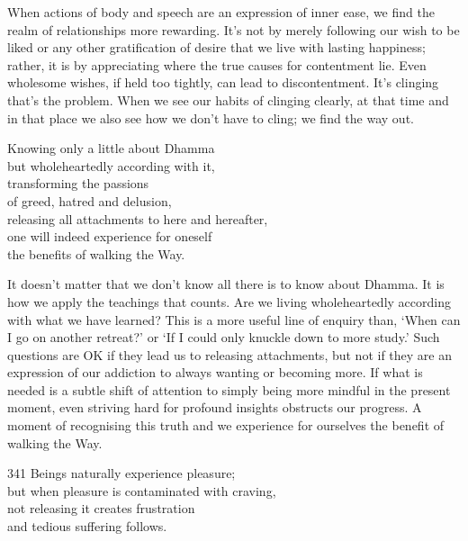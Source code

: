 \begin{dhpRefl}

When actions of body and speech are an expression of inner ease, we
find the realm of relationships more rewarding. It's not by merely
following our wish to be liked or any other gratification of desire
that we live with lasting happiness; rather, it is by appreciating
where the true causes for contentment lie. Even wholesome wishes, if
held too tightly, can lead to discontentment. It's clinging that's the
problem. When we see our habits of clinging clearly, at that time and
in that place we also see how we don't have to cling; we find the way
out.

\end{dhpRefl}


\begin{dhpVerse}{20}
\label{dhp-20}
Knowing only a little about Dhamma\\
but wholeheartedly according with it,\\
transforming the passions\\
of greed, hatred and delusion,\\
releasing all attachments to here and hereafter,\\
one will indeed experience for oneself\\
the benefits of walking the Way.
\end{dhpVerse}

\begin{dhpRefl}

It doesn't matter that we don't know all there is to know about
Dhamma. It is how we apply the teachings that counts. Are we living
wholeheartedly according with what we have learned? This is a more
useful line of enquiry than, `When can I go on another retreat?' or
`If I could only knuckle down to more study.' Such questions are OK
if they lead us to releasing attachments, but not if they are an
expression of our addiction to always wanting or becoming more. If
what is needed is a subtle shift of attention to simply being more
mindful in the present moment, even striving hard for profound
insights obstructs our progress. A moment of recognising this truth
and we experience for ourselves the benefit of walking the Way.

\end{dhpRefl}


\begin{dhpVerse}{341}
\label{dhp-341}
Beings naturally experience pleasure;\\
but when pleasure is contaminated with craving,\\
not releasing it creates frustration\\
and tedious suffering follows.
\end{dhpVerse}

